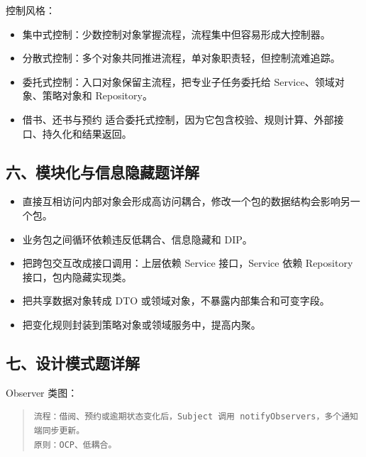 \documentclass[UTF8,zihao=-4]{ctexart}
\begin{document}



控制风格：


\begin{itemize}
\item 集中式控制：少数控制对象掌握流程，流程集中但容易形成大控制器。
\item 分散式控制：多个对象共同推进流程，单对象职责轻，但控制流难追踪。
\item 委托式控制：入口对象保留主流程，把专业子任务委托给 Service、领域对象、策略对象和 Repository。
\item 借书、还书与预约 适合委托式控制，因为它包含校验、规则计算、外部接口、持久化和结果返回。
\end{itemize}



\subsection{六、模块化与信息隐藏题详解}


\begin{itemize}
\item 直接互相访问内部对象会形成高访问耦合，修改一个包的数据结构会影响另一个包。
\item 业务包之间循环依赖违反低耦合、信息隐藏和 DIP。
\item 把跨包交互改成接口调用：上层依赖 Service 接口，Service 依赖 Repository 接口，包内隐藏实现类。
\item 把共享数据对象转成 DTO 或领域对象，不暴露内部集合和可变字段。
\item 把变化规则封装到策略对象或领域服务中，提高内聚。
\end{itemize}



\subsection{七、设计模式题详解}


Observer 类图：

\ExamObserverDiagram

\begin{quote}
\footnotesize
\begin{verbatim}
流程：借阅、预约或逾期状态变化后，Subject 调用 notifyObservers，多个通知端同步更新。
原则：OCP、低耦合。
\end{verbatim}
\end{quote}
\end{document}
